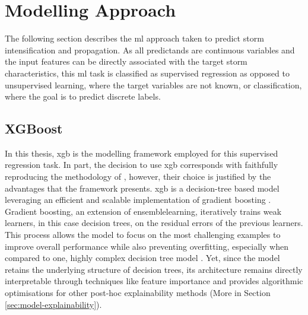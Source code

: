 \section{Modelling Approach}

The following section describes the \acrfull{ml} approach taken to predict storm intensification and propagation. As all predictands are continuous variables and the input features can be directly associated with the target storm characteristics, this \acrshort{ml} task is classified as supervised regression as opposed to unsupervised learning, where the target variables are not known, or classification, where the goal is to predict discrete labels.

\subsection{XGBoost}

In this thesis, \acrfull{xgb} is the modelling framework employed for this supervised regression task. In part, the decision to use \acrshort{xgb} corresponds with faithfully reproducing the methodology of \cite{Hunt2024}, however, their choice is justified by the advantages that the framework presents. \acrshort{xgb} is a decision-tree based model leveraging an efficient and scalable implementation of gradient boosting \citep{Chen2016}. Gradient boosting, an extension of \gls{ensemblelearning}, iteratively trains weak learners, in this case decision trees, on the residual errors of the previous learners. This process allows the model to focus on the most challenging examples to improve overall performance while also preventing overfitting, especially when compared to one, highly complex decision tree model \citep{Friedman2001}. Yet, since the model retains the underlying structure of decision trees, its architecture remains directly interpretable through techniques like feature importance and provides algorithmic optimisations for other post-hoc explainability methods \citep{Lundberg2020} (More in Section \ref{sec:model-explainability}).


